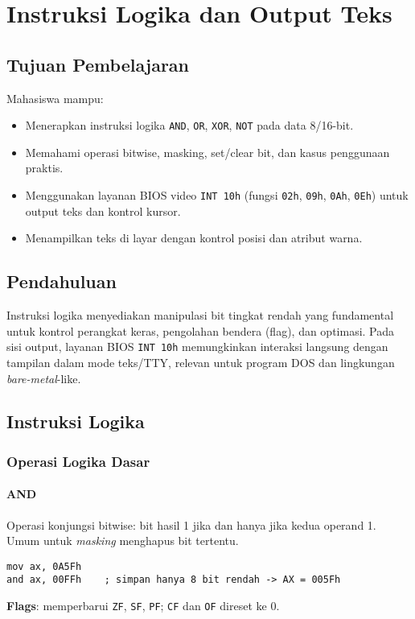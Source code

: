 \documentclass[../main.tex]{subfiles}
\begin{document}
\chapter{Instruksi Logika dan Output Teks}

\section{Tujuan Pembelajaran}
Mahasiswa mampu:
\begin{itemize}
    \item Menerapkan instruksi logika \texttt{AND}, \texttt{OR}, \texttt{XOR}, \texttt{NOT} pada data 8/16-bit.
    \item Memahami operasi bitwise, masking, set/clear bit, dan kasus penggunaan praktis.
    \item Menggunakan layanan BIOS video \texttt{INT 10h} (fungsi \texttt{02h}, \texttt{09h}, \texttt{0Ah}, \texttt{0Eh}) untuk output teks dan kontrol kursor.
    \item Menampilkan teks di layar dengan kontrol posisi dan atribut warna.
\end{itemize}

\section{Pendahuluan}
Instruksi logika menyediakan manipulasi bit tingkat rendah yang fundamental untuk kontrol perangkat keras, pengolahan bendera (flag), dan optimasi. Pada sisi output, layanan BIOS \texttt{INT 10h} memungkinkan interaksi langsung dengan tampilan dalam mode teks/TTY, relevan untuk program DOS dan lingkungan \textit{bare-metal}-like.

\section{Instruksi Logika}
\subsection{Operasi Logika Dasar}
\subsubsection{AND}
Operasi konjungsi bitwise: bit hasil 1 jika dan hanya jika kedua operand 1. Umum untuk \textit{masking} menghapus bit tertentu.
\begin{verbatim}
mov ax, 0A5Fh
and ax, 00FFh    ; simpan hanya 8 bit rendah -> AX = 005Fh
\end{verbatim}
\textbf{Flags}: memperbarui \texttt{ZF}, \texttt{SF}, \texttt{PF}; \texttt{CF} dan \texttt{OF} direset ke 0.
\end{document}
